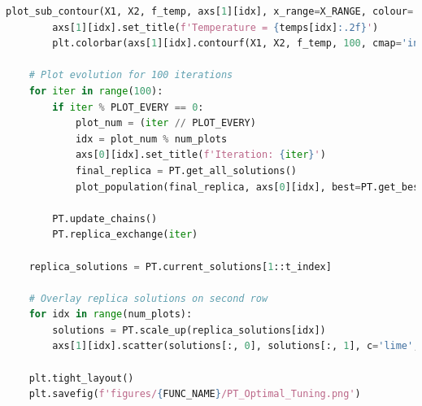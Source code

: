 \documentclass[10pt]{article}
\begin{document}
\begin{lstlisting}[language=Python, caption=PT\_TuningExperiments.py, label=PT_TuningExperimentspy]
        plot_sub_contour(X1, X2, f_temp, axs[1][idx], x_range=X_RANGE, colour='Greys')
        axs[1][idx].set_title(f'Temperature = {temps[idx]:.2f}')
        plt.colorbar(axs[1][idx].contourf(X1, X2, f_temp, 100, cmap='inferno'), ax=axs[1][idx])
    
    # Plot evolution for 100 iterations
    for iter in range(100):
        if iter % PLOT_EVERY == 0:
            plot_num = (iter // PLOT_EVERY)
            idx = plot_num % num_plots
            axs[0][idx].set_title(f'Iteration: {iter}')
            final_replica = PT.get_all_solutions()
            plot_population(final_replica, axs[0][idx], best=PT.get_best_solution(), last=final_replica[-1])
    
        PT.update_chains()
        PT.replica_exchange(iter)
    
    replica_solutions = PT.current_solutions[1::t_index]
    
    # Overlay replica solutions on second row
    for idx in range(num_plots):
        solutions = PT.scale_up(replica_solutions[idx])
        axs[1][idx].scatter(solutions[:, 0], solutions[:, 1], c='lime', s=15, label='Replica Solutions')
    
    plt.tight_layout()
    plt.savefig(f'figures/{FUNC_NAME}/PT_Optimal_Tuning.png')    
\end{lstlisting}
\end{document}
